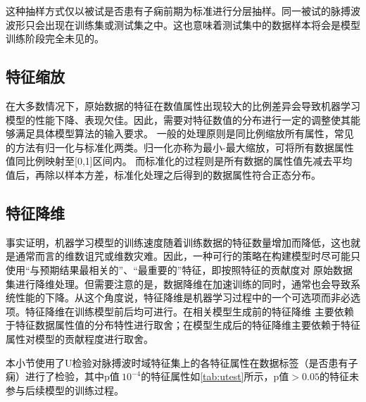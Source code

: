 这种抽样方式仅以被试是否患有子痫前期为标准进行分层抽样。同一被试的脉搏波波形只会出现在训练集或测试集之中。这也意味着测试集中的数据样本将会是模型训练阶段完全未见的。

\subsection{特征缩放}
  在大多数情况下，原始数据的特征在数值属性出现较大的比例差异会导致机器学习模型的性能下降、表现欠佳\cite{Aurélien2018}。因此，需要对特征数值的分布进行一定的调整使其能够满足具体模型算法的输入要求。
  一般的处理原则是同比例缩放所有属性，常见的方法有归一化与标准化两类。归一化亦称为最小-最大缩放，可将所有数据属性值同比例映射至[0,1]区间内。
  而标准化的过程则是所有数据的属性值先减去平均值后，再除以样本方差，标准化处理之后得到的数据属性符合正态分布。

\subsection{特征降维}
事实证明，机器学习模型的训练速度随着训练数据的特征数量增加而降低，这也就是通常而言的维数诅咒或维数灾难。因此，一种可行的策略在构建模型时尽可能只使用“与预期结果最相关的”、“最重要的”特征，即按照特征的贡献度对
原始数据集进行降维处理。但需要注意的是，数据降维在加速训练的同时，通常也会导致系统性能的下降。从这个角度说，特征降维是机器学习过程中的一个可选项而非必选项。特征降维在训练模型前后均可进行。在相关模型生成前的特征降维
主要依赖于特征数据属性值的分布特性进行取舍；在模型生成后的特征降维主要依赖于特征属性对模型的贡献程度进行取舍。

本小节使用了U检验对脉搏波时域特征集上的各特征属性在数据标签（是否患有子痫）进行了检验，其中p值$\> 10^{-4}$的特征属性如\autoref{tab:utest}所示，p值$> 0.05$的特征未参与后续模型的训练过程。

